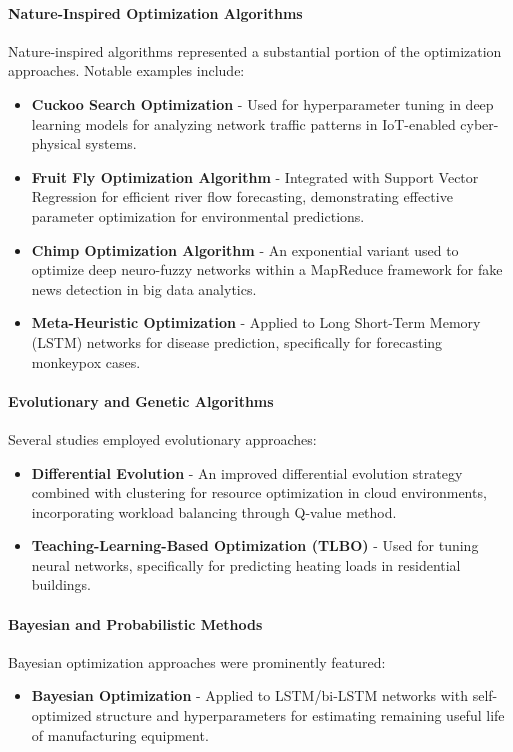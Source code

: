 \paragraph{Nature-Inspired Optimization Algorithms}
Nature-inspired algorithms represented a substantial portion of the optimization approaches. Notable examples include:
\begin{itemize}
    \item \textbf{Cuckoo Search Optimization} \citep{Sagu202535} - Used for hyperparameter tuning in deep learning models for analyzing network traffic patterns in IoT-enabled cyber-physical systems.
    
    \item \textbf{Fruit Fly Optimization Algorithm} \citep{Samadianfard20191934} - Integrated with Support Vector Regression for efficient river flow forecasting, demonstrating effective parameter optimization for environmental predictions.
    
    \item \textbf{Chimp Optimization Algorithm} \citep{Kanchanamala20232414} - An exponential variant used to optimize deep neuro-fuzzy networks within a MapReduce framework for fake news detection in big data analytics.
    
    \item \textbf{Meta-Heuristic Optimization} \citep{Eid20223845} - Applied to Long Short-Term Memory (LSTM) networks for disease prediction, specifically for forecasting monkeypox cases.
\end{itemize}

\paragraph{Evolutionary and Genetic Algorithms}
Several studies employed evolutionary approaches:
\begin{itemize}
    \item \textbf{Differential Evolution} \citep{Zhou20211} - An improved differential evolution strategy combined with clustering for resource optimization in cloud environments, incorporating workload balancing through Q-value method.
    
    \item \textbf{Teaching-Learning-Based Optimization (TLBO)} \citep{Almutairi20225924} - Used for tuning neural networks, specifically for predicting heating loads in residential buildings.
\end{itemize}

\paragraph{Bayesian and Probabilistic Methods}
Bayesian optimization approaches were prominently featured:
\begin{itemize}
    \item \textbf{Bayesian Optimization} \citep{Thoppil2021} - Applied to LSTM/bi-LSTM networks with self-optimized structure and hyperparameters for estimating remaining useful life of manufacturing equipment.
\end{itemize}

